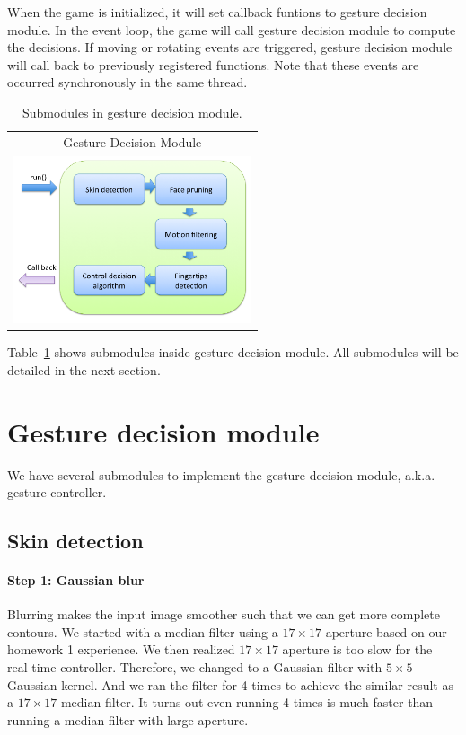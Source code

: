 \documentclass[10pt,twocolumn,letterpaper]{article}
\begin{document}
When the game is initialized, it will set callback funtions to gesture 
decision module. In the event loop, the game will call gesture decision 
module to compute the decisions. If moving or rotating events are 
triggered, gesture decision module will call back to previously registered 
functions. Note that these events are occurred synchronously in the same thread.

\begin{table}
\begin{tabular}{c}
Gesture Decision Module \\
\includegraphics[width=7cm]{gesturemodule.png}
\end{tabular}
\caption{Submodules in gesture decision module.}
\label{fig:gesturemodule}
\end{table}



Table~\ref{fig:gesturemodule} shows submodules inside gesture decision module. 
All submodules will be detailed in the next section.

\section{Gesture decision module}
\label{sec:gesture}
We have several submodules to implement the gesture decision module, a.k.a. gesture controller.

\subsection{Skin detection}
\label{sec:skin}
\paragraph{Step 1: Gaussian blur}
Blurring makes the input image smoother such that we can get more complete contours. 
We started with a median filter using a $17 \times 17$ aperture based on our homework 1 experience. 
We then realized $17 \times 17$ aperture is too slow for the real-time controller. Therefore, we 
changed to a Gaussian filter with $5 \times 5$ Gaussian kernel. And we ran the filter for 4 times 
to achieve the similar result as a $17 \times 17$ median filter. It turns out even running 4 times 
is much faster than running a median filter with large aperture.
\end{document}
